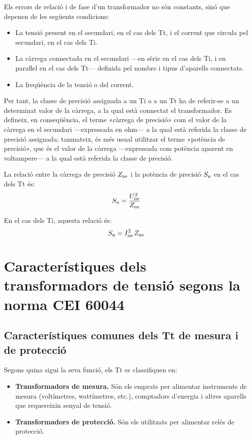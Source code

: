 Els errors de relació i de fase d'un transformador no són
constants, sinó que depenen de les següents condicions:
\begin{itemize}
   \item La tensió present en el secundari, en el cas dels Tt, i el corrent que
   circula    pel secundari, en el cas dels Ti.
   \item La càrrega connectada en el secundari ---en sèrie en el cas dels Ti,
   i en paraŀlel en el cas dels Tt--- definida pel nombre i tipus d'aparells connectats.
   \item La freqüència de la tensió o del corrent.
\end{itemize}

Per tant, la classe de precisió assignada a un Ti o a un Tt ha de
referir-se a un determinat valor de la càrrega, a la qual està
connectat el transformador. Es defineix, en conseqüència, el terme
«càrrega de precisió» com el valor de la càrrega en el secundari
---expressada en ohm--- a la qual està referida la classe de precisió
assignada; tanmateix, és més usual  utilitzar el terme «potència
de precisió», que és el valor de la càrrega ---expressada com potència aparent en voltampere---
 a la qual està referida la classe de precisió.

La relació entre la càrrega de precisió $Z_\mathrm{ns}$ i la potència de
precisió $S_\mathrm{n}$ en el cas dels Tt és:
\begin{equation}
    S_\mathrm{n} = \frac{U_\mathrm{ns}^2}{Z_\mathrm{ns}}
\end{equation}

En el cas dels Ti, aquesta relació és:
\begin{equation}\label{eq:sn_ti}
    S_\mathrm{n} = I_\mathrm{ns}^2 \,Z_\mathrm{ns}
\end{equation}


\section{Característiques dels transformadors de tensió segons la norma CEI 60044}

\subsection{Característiques comunes dels Tt de mesura i de protecció}

Segons quina sigui la seva funció, els Tt es classifiquen en:
\begin{itemize}
	\item \textbf{Transformadors de mesura.} Són els emprats per alimentar
	instruments de mesura (voltímetres, wattímetres, etc.),         comptadors d'energia i altres aparells que requereixin senyal de tensió.
	\item \textbf{Transformadors de protecció.}  Són els utilitzats per
	alimentar relés de protecció.
\end{itemize}

